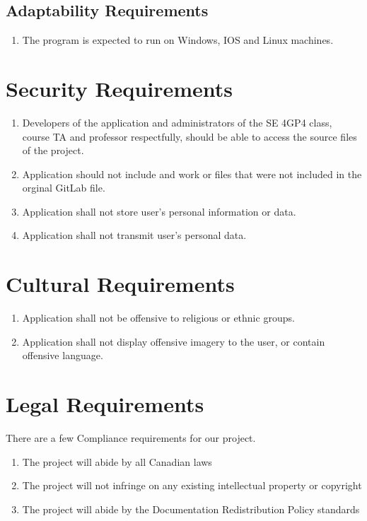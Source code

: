 \documentclass{article}
\begin{document}
\subsection{Adaptability Requirements}
\begin{enumerate}[{AR}1. ]
	\item The program is expected to run on Windows, IOS and Linux machines.
\end{enumerate}
\section{Security Requirements}
\begin{enumerate}[{SR}1. ]
	\item Developers of the application and administrators of the SE 4GP4 class, course TA and professor respectfully, should be able to access the source files of the project.
	\item Application should not include and work or files that were not included in the orginal GitLab file.
	\item Application shall not store user's personal information or data.
	\item Application shall not transmit user's personal data.
\end{enumerate}
\section{Cultural Requirements}
\begin{enumerate}[{CR}1. ]
	\item Application shall not be offensive to religious or ethnic groups.
	\item Application shall not display offensive imagery to the user, or contain offensive language.
\end{enumerate}
\section{Legal Requirements}
\quad There are a few Compliance requirements for our project.
\begin{enumerate}[{LR}1. ]
	\item The project will abide by all Canadian laws
	\item The project will not infringe on any existing intellectual property or copyright 
	\item The project will abide by the Documentation Redistribution Policy standards
\end{enumerate}
\end{document}
